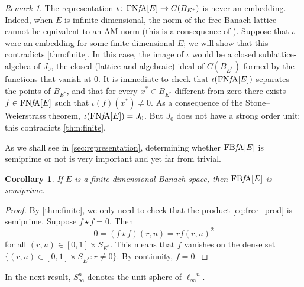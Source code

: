 \documentclass{memo-l}
\newtheorem{cor}[theorem]{Corollary}
\theoremstyle{definition}
\theoremstyle{remark}
\newtheorem{rem}[theorem]{Remark}
\numberwithin{section}{chapter}
\numberwithin{equation}{chapter}
\newcommand{\el}[1]{\ensuremath{\ell_{#1}}}
\newcommand{\FNFA}[1]{\operatorname{FN{\it f}\!A}[#1]}
\newcommand{\FBFA}[1]{\operatorname{FB{\it f}\!A}[#1]}
\newcommand{\Sinfn}{S_\infty^n}
\begin{document}
\begin{rem}\label{rem:notembed}
    The representation $\iota \colon \FNFA E\to C(B_{E^{*}})$ is never
    an embedding. Indeed, when $E$ is infinite-dimensional, the norm
    of the free Banach lattice cannot be equivalent to an
    AM-norm (this is a consequence of \cite[Proposition 9.30]{oikhberg_etal2022}).
    Suppose that $\iota $ were an embedding for some
    finite-dimensional $E$; we will show
    that this contradicts \cref{thm:finite}. In this case, the image
    of $\iota $ would be a closed sublattice-algebra of $J_0$, the
    closed (lattice and algebraic) ideal of
    $C(B_{E^{*}})$ formed by the functions that vanish at $0$. It is immediate to check that
    $\iota (\FNFA E)$ separates the points of $B_{E^{*}}$, and that
    for every $x^{*} \in B_{E^{*}}$ different from zero there exists
    $f \in \FNFA E$ such that $\iota (f)(x^{*})\neq 0$. As a
    consequence of the
    Stone--Weierstrass theorem, $\iota (\FNFA E)=J_0$. But $J_0$ does
    not have a strong order unit; this contradicts
    \cref{thm:finite}.
\end{rem}

As we shall see in \cref{sec:representation}, determining whether
$\FBFA E$ is semiprime or not is very important and yet far from
trivial.

\begin{cor}\label{cor:finite_semiprime}
    If $E$ is a finite-dimensional Banach space, then $\FBFA E$ is
    semiprime.
\end{cor}
\begin{proof}
    By \cref{thm:finite},
    we only need to check that the product \eqref{eq:free_prod} is
    semiprime. Suppose $f\star f=0$. Then
    \[
    0=(f\star f)(r,u)=r f(r,u)^2
    \]
    for all $(r,u)\in [0,1]\times S_{E^{*}}$. This means that $f$
    vanishes on the dense set $\{(r,u) \in [0,1]\times S_{E^{*}}:
    r\neq 0\}$. By continuity, $f=0$.
\end{proof}

In the next result, $\Sinfn$ denotes the unit sphere of $\el \infty ^{n}$.
\end{document}
